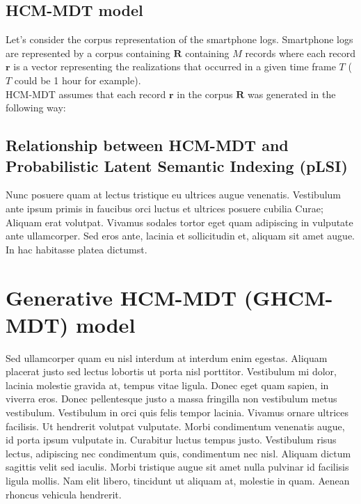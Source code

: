 \subsection{HCM-MDT model}

Let's consider the corpus representation of the smartphone logs. Smartphone logs are represented by a corpus  containing $\boldsymbol{R}$ containing $\mathit{M}$ records where each record $\mathbf{r}$ is a vector representing the realizations that occurred in a given time frame $\mathit{T}$ ($\mathit{T}$ could be 1 hour for example).
\\HCM-MDT assumes that each record $\mathbf{r}$ in the corpus $\boldsymbol{R}$ was generated in the following way:


\subsection{Relationship between HCM-MDT and Probabilistic Latent Semantic Indexing (pLSI)}

Nunc posuere quam at lectus tristique eu ultrices augue venenatis. Vestibulum ante ipsum primis in faucibus orci luctus et ultrices posuere cubilia Curae; Aliquam erat volutpat. Vivamus sodales tortor eget quam adipiscing in vulputate ante ullamcorper. Sed eros ante, lacinia et sollicitudin et, aliquam sit amet augue. In hac habitasse platea dictumst.


\section{Generative HCM-MDT (GHCM-MDT) model}

Sed ullamcorper quam eu nisl interdum at interdum enim egestas. Aliquam placerat justo sed lectus lobortis ut porta nisl porttitor. Vestibulum mi dolor, lacinia molestie gravida at, tempus vitae ligula. Donec eget quam sapien, in viverra eros. Donec pellentesque justo a massa fringilla non vestibulum metus vestibulum. Vestibulum in orci quis felis tempor lacinia. Vivamus ornare ultrices facilisis. Ut hendrerit volutpat vulputate. Morbi condimentum venenatis augue, id porta ipsum vulputate in. Curabitur luctus tempus justo. Vestibulum risus lectus, adipiscing nec condimentum quis, condimentum nec nisl. Aliquam dictum sagittis velit sed iaculis. Morbi tristique augue sit amet nulla pulvinar id facilisis ligula mollis. Nam elit libero, tincidunt ut aliquam at, molestie in quam. Aenean rhoncus vehicula hendrerit.

